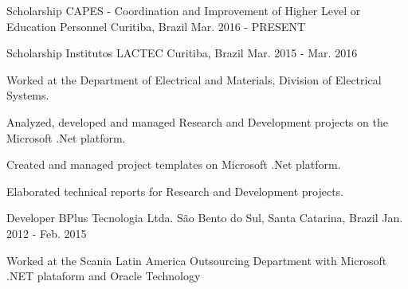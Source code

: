 

\begin{cventries}

  \cventry
    {Scholarship} %
    {CAPES - Coordination and Improvement of Higher Level or Education Personnel} %
    {Curitiba, Brazil} %
    {Mar. 2016 - PRESENT} %
    {
    }

  \cventry
    {Scholarship} %
    {Institutos LACTEC} %
    {Curitiba, Brazil} %
    {Mar. 2015 - Mar. 2016} %
    {
      \begin{cvitems} %
        \item {Worked at the Department of Electrical and Materials, Division of Electrical Systems.}
        \item {Analyzed, developed and managed Research and Development projects on the Microsoft .Net platform.}
        \item {Created and managed project templates on Microsoft .Net platform.}
        \item {Elaborated technical reports for Research and Development projects.}
      \end{cvitems}
    }

  \cventry
    {Developer} %
    {BPlus Tecnologia Ltda.} %
    {São Bento do Sul, Santa Catarina, Brazil} %
    {Jan. 2012 - Feb. 2015} %
    {
      \begin{cvitems} %
        \item {Worked at the Scania Latin America Outsourcing Department with Microsoft .NET plataform and Oracle Technology}
      \end{cvitems}
    }


\end{cventries}

